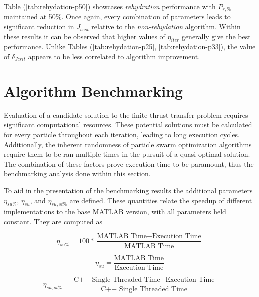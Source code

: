 \noindent Table (\ref{tab:rehydation-p50}) showcases \textit{rehydration} performance with 
$P_{r,\text{\%}}$ maintained at 50\%. Once again, every combination of parameters leads to 
significant reduction in $\bar{J}_{best}$ relative to the \textit{non-rehydation} algorithm. 
Within these results it can be observed that higher values of
$\eta_{iter}$ generally give the best performance. Unlike Tables (\ref{tab:rehydation-p25}, \ref{tab:rehydation-p33}), 
the value of $\delta_{Jcrit}$ appears to be less correlated to algorithm improvement.

\section{Algorithm Benchmarking}

\noindent Evaluation of a candidate solution to the finite thrust transfer problem requires significant computational resources.
These potential solutions must be calculated for every particle throughout each iteration, leading to long execution cycles.
Additionally, the inherent randomness of particle swarm optimization algorithms require them to be ran multiple times in the
pursuit of a quasi-optimal solution. The combination of these factors prove execution time to be paramount, thus the benchmarking
analysis done within this section. \newline

\noindent To aid in the presentation of the benchmarking results the additional parameters $\eta_{su\%}$, $\eta_{su}$, and $\eta_{su,st\%}$ are defined. 
These quantities relate the speedup of different implementations to the base MATLAB version, with all parameters held constant. 
They are computed as

\begin{equation}
\eta_{su\%} = 100*\frac{\text{MATLAB Time} - \text{Execution Time}}{\text{MATLAB Time}}
\label{eq:etaSUpercent}
\end{equation}


\begin{equation}
  \eta_{su} = \frac{\text{MATLAB Time}}{\text{Execution Time}}
  \label{eq:etaSU}
  \end{equation}


\begin{equation}
  \eta_{su,st\%} = \frac{\text{C++ Single Threaded Time} - \text{Execution Time}}{\text{C++ Single Threaded Time}}
  \label{eq:etaSUSTpercent}
  \end{equation}

